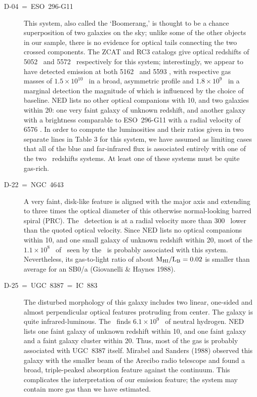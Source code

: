 \begin{description}
\item[D-04~=~ESO~296-G11]
This system, also called the `Boomerang,' 
is thought to be a chance superposition of two galaxies 
on the sky; unlike some of the other objects in our sample, there is no 
evidence for optical tails connecting the two crossed components.  
The ZCAT and RC3 catalogs give optical redshifts of 
5052 \KMS\ and 5572 \KMS\ respectively for this system; interestingly, 
we appear to have detected emission at both 5162 \KMS\ and 5593 \KMS , with 
respective gas masses of $1.5 \times 10^{10}$ \MSUN\ in a broad, asymmetric 
profile and $1.8 \times 10^{9}$ \MSUN\ in a marginal detection the 
magnitude of which is influenced by the choice of baseline.  
NED lists no other optical companions with 10\AMIN, and two galaxies 
within 20\AMIN: one very faint galaxy of unknown redshift, and another 
galaxy with a brightness comparable to ESO~296-G11 with a 
radial velocity of 6576 \KMS.  In order to compute the luminosities and 
their ratios given in two separate lines in Table 3 for this system, 
we have assumed as limiting cases that all of the blue and far-infrared 
flux is associated entirely with one of the two \HI\ redshifts systems.
At least one of these systems must be quite gas-rich.

\item[D-22~=~NGC~4643]
A very faint, disk-like feature is aligned with 
the major axis and extending to three times the optical diameter 
of this otherwise normal-looking barred spiral (\cf PRC).  
The \ detection 
is at a radial velocity more than 300 \KMS\ lower than the quoted 
optical velocity.  
Since NED lists no optical companions within 10\AMIN, and one small galaxy 
of unknown redshift within 20\AMIN, most of the 
$1.1 \times 10^{8}$ \MSUN\ of \HI\ seen by the \ is probably 
associated with this system.  Nevertheless, its gas-to-light ratio of
about $\rm M_{\rm HI}/L_{B} = 0.02$ is smaller than average for an
SB0/a (Giovanelli \& Haynes 1988). 

\item[D-25~=~UGC~8387~=~IC~883]
The disturbed morphology of this galaxy includes two linear, one-sided 
and almost perpendicular optical features protruding from center. 
The galaxy is quite infrared-luminous.
The \ finds $6.1 \times 10^{9}$ \MSUN\ of 
neutral hydrogen.  NED lists one faint galaxy of unknown redshift within 
10\AMIN, and one faint galaxy and a faint galaxy cluster within 20\AMIN.  
Thus, most of the gas is probably associated with UGC~8387 itself.  
Mirabel and Sanders (1988) 
observed this galaxy with the smaller beam of the Arecibo radio telescope 
and found a broad, triple-peaked absorption feature against the 
continuum.  This complicates the interpretation of our emission feature; 
the system may contain more gas than we have estimated.


\end{description}
